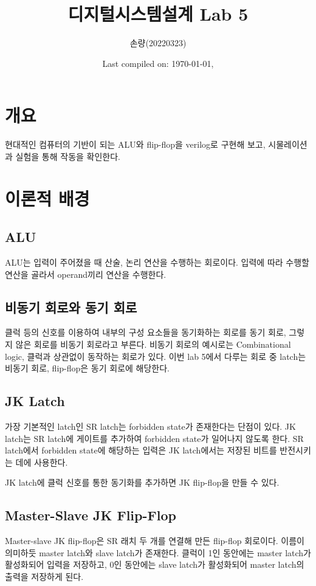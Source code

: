 \documentclass{scrartcl}
\title{디지털시스템설계 Lab 5}
\author{손량(20220323)}
\date{Last compiled on: \today, \currenttime}
\begin{document}
\maketitle

\section{개요}
현대적인 컴퓨터의 기반이 되는 ALU와 flip-flop을 verilog로 구현해 보고, 시물레이션과 실험을 통해 작동을 확인한다.

\section{이론적 배경}
\subsection{ALU}
ALU는 입력이 주어졌을 때 산술, 논리 연산을 수행하는 회로이다.
입력에 따라 수행할 연산을 골라서 operand끼리 연산을 수행한다.

\subsection{비동기 회로와 동기 회로}
클럭 등의 신호를 이용하여 내부의 구성 요소들을 동기화하는 회로를 동기 회로, 그렇지 않은 회로를 비동기 회로라고 부른다.
비동기 회로의 예시로는 Combinational logic, 클럭과 상관없이 동작하는 회로가 있다.
이번 lab 5에서 다루는 회로 중 latch는 비동기 회로, flip-flop은 동기 회로에 해당한다.

\subsection{JK Latch}
가장 기본적인 latch인 SR latch는 forbidden state가 존재한다는 단점이 있다.
JK latch는 SR latch에 게이트를 추가하여 forbidden state가 일어나지 않도록 한다.
SR latch에서 forbidden state에 해당하는 입력은 JK latch에서는 저장된 비트를 반전시키는 데에 사용한다.

JK latch에 클럭 신호를 통한 동기화를 추가하면 JK flip-flop을 만들 수 있다.

\subsection{Master-Slave JK Flip-Flop}
Master-slave JK flip-flop은 SR 래치 두 개를 연결해 만든 flip-flop 회로이다.
이름이 의미하듯 master latch와 slave latch가 존재한다.
클럭이 1인 동안에는 master latch가 활성화되어 입력을 저장하고, 0인 동안에는 slave latch가 활성화되어 master latch의 출력을 저장하게 된다.
\end{document}
